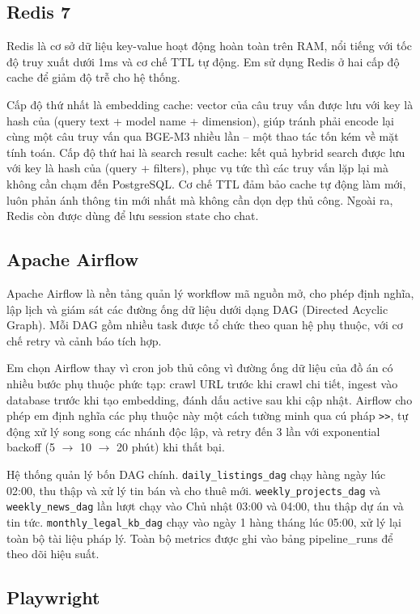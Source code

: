 \subsection{Redis 7}

Redis là cơ sở dữ liệu key-value hoạt động hoàn toàn trên RAM, nổi tiếng với tốc độ truy xuất dưới 1ms và cơ chế TTL tự động. Em sử dụng Redis ở hai cấp độ cache để giảm độ trễ cho hệ thống.

Cấp độ thứ nhất là embedding cache: vector của câu truy vấn được lưu với key là hash của (query text + model name + dimension), giúp tránh phải encode lại cùng một câu truy vấn qua BGE-M3 nhiều lần -- một thao tác tốn kém về mặt tính toán. Cấp độ thứ hai là search result cache: kết quả hybrid search được lưu với key là hash của (query + filters), phục vụ tức thì các truy vấn lặp lại mà không cần chạm đến PostgreSQL. Cơ chế TTL đảm bảo cache tự động làm mới, luôn phản ánh thông tin mới nhất mà không cần dọn dẹp thủ công. Ngoài ra, Redis còn được dùng để lưu session state cho chat.

\subsection{Apache Airflow}

Apache Airflow là nền tảng quản lý workflow mã nguồn mở, cho phép định nghĩa, lập lịch và giám sát các đường ống dữ liệu dưới dạng DAG (Directed Acyclic Graph). Mỗi DAG gồm nhiều task được tổ chức theo quan hệ phụ thuộc, với cơ chế retry và cảnh báo tích hợp.

Em chọn Airflow thay vì cron job thủ công vì đường ống dữ liệu của đồ án có nhiều bước phụ thuộc phức tạp: crawl URL trước khi crawl chi tiết, ingest vào database trước khi tạo embedding, đánh dấu active sau khi cập nhật. Airflow cho phép em định nghĩa các phụ thuộc này một cách tường minh qua cú pháp \texttt{>>}, tự động xử lý song song các nhánh độc lập, và retry đến 3 lần với exponential backoff (5 $\rightarrow$ 10 $\rightarrow$ 20 phút) khi thất bại.

Hệ thống quản lý bốn DAG chính. \texttt{daily\_listings\_dag} chạy hàng ngày lúc 02:00, thu thập và xử lý tin bán và cho thuê mới. \texttt{weekly\_projects\_dag} và \texttt{weekly\_news\_dag} lần lượt chạy vào Chủ nhật 03:00 và 04:00, thu thập dự án và tin tức. \texttt{monthly\_legal\_kb\_dag} chạy vào ngày 1 hàng tháng lúc 05:00, xử lý lại toàn bộ tài liệu pháp lý. Toàn bộ metrics được ghi vào bảng pipeline\_runs để theo dõi hiệu suất.

\subsection{Playwright}

